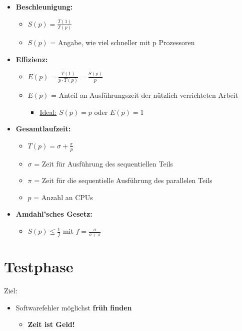 \documentclass[parskip=full, 12pt]{scrartcl}
\begin{document}
				\begin{itemize}
					\item \textbf{Beschleunigung:}
					\begin{itemize}
						\item {\LARGE ${S}{\left(p\right)}=\frac{T\left(1\right)}{T\left(p\right)}$}
						\item ${S}{\left(p\right)}$ = Angabe, wie viel schneller mit p Prozessoren
					\end{itemize}
					\item \textbf{Effizienz:}
					\begin{itemize}
						\item {\LARGE ${E}{\left(p\right)}=\frac{T\left(1\right)}{p\cdot T\left(p\right)}=\frac{{S}{\left(p\right)}}{p}$}
						\item ${E}{\left(p\right)}$ = Anteil an Ausführungszeit der nützlich verrichteten Arbeit
						\begin{itemize}
							\item \underline{Ideal:} ${S}{\left(p\right)} = {p}$ oder ${E}{\left(p\right)} = {1}$
						\end{itemize}
					\end{itemize}
					\item \textbf{Gesamtlaufzeit:}
					\begin{itemize}
						\item {\LARGE ${T}{\left(p\right)} = \sigma + \frac{\pi}{{p}}$}
						\item $\sigma$ = Zeit für Ausführung des sequentiellen Teils
						\item $\pi$ = Zeit für die sequentielle Ausführung des parallelen Teils
						\item ${p}$ = Anzahl an CPUs
					\end{itemize}
					\item \textbf{Amdahl'sches Gesetz:}
					\begin{itemize}
						\item {\LARGE ${S}{\left(p\right)} \le \frac{1}{f}$} mit {\LARGE ${f} = \frac{\sigma}{\sigma + \pi}$}
					\end{itemize}
				\end{itemize}
					
	\newpage
	\section{Testphase}
	
		Ziel:
		
		\begin{itemize}
			\item Softwarefehler möglichst \textbf{früh finden}
			\begin{itemize}
				\item \textbf{Zeit ist Geld!}
			\end{itemize}
		\end{itemize}
	
\end{document}
